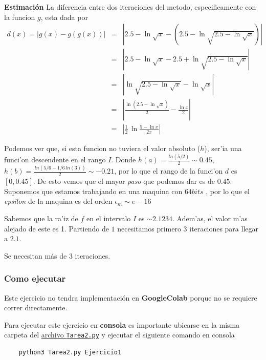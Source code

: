 \documentclass[11pt]{article}
\begin{document}
	\textbf{Estimaci\'on} La diferencia entre dos iteraciones del metodo,
	especificamente con la funcion \(g\), esta dada por \begin{eqnarray*}
		d(x) = \left| g(x) - g(g(x)) \right| &=& \left| 2.5-\ln\sqrt x - \left(2.5 - \ln\sqrt{2.5 - \ln\sqrt x} \right)\right| \\
		    &=& \left| 2.5-\ln\sqrt x - 2.5 + \ln\sqrt{2.5 - \ln\sqrt x} \right| \\
		    &=& \left| \ln\sqrt{2.5 - \ln\sqrt x} -\ln\sqrt x \right| \\
		    &=& \left| \frac{\ln(2.5 - \ln\sqrt x)}{2} - \frac{\ln x}{2} \right| \\
		    &=& \left| \frac{1}{2} \, \ln\frac{5- \ln x}{2x}\right|
	\end{eqnarray*}

	Podemos ver que, si esta funcion no tuviera el valor absoluto (\(h\)),
	ser'ia una funci'on descendente en el rango \(I\). Donde
	\(h(a) = \frac{ln(5/2)}{2} \sim 0.45\),
	\(h(b) = \frac{\, ln(5/6 - 1/6 \, ln(3))}{2} \sim -0.21\), por lo que el
	rango de la funci'on \(d\) es \([0, 0.45]\). De esto vemos que el mayor
	\emph{paso} que podemos dar es de \(0.45\). Suponemos que estamos
	trabajando en una maquina con \(64 bits\) , por lo que el \emph{epsilon}
	de la maquina es del orden \(\epsilon_m \sim e-16\)

	Sabemos que la ra'iz de \(f\) en el intervalo \(I\) es \(\sim 2.1234\).
	Adem'as, el valor m'as alejado de este es 1. Partiendo de \(1\)
	necesitamos primero 3 iteraciones para llegar a \(2.1\).

	Se necesitan m\'as de 3 iteraciones.

		\hypertarget{como-ejecutar}{%
	\subsubsection{Como ejecutar}\label{como-ejecutar}}

		Este ejercicio no tendra implementaci\'on en \textbf{GoogleColab} porque
	no se requiere correr directamente.

	Para ejecutar este ejercicio en \textbf{consola} es importante ubicarse
	en la misma carpeta del
	\href{https://github.com/BenchHPZ/UG-Compu/blob/master/MN/Tareas/T2/Tarea2.py}{archivo
	\texttt{Tarea2.py}} y ejecutar el siguiente comando en consola

	\begin{verbatim}
	python3 Tarea2.py Ejercicio1
	\end{verbatim}
\end{document}
